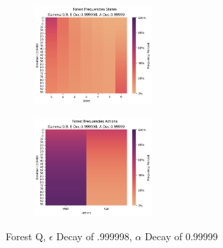 \documentclass[letterpaper]{article} %
\begin{document}
\begin{figure}[!htb]
	\begin{subfigure}[b]{0.25\textwidth}
		\centering
		\includegraphics[width=1.75in]{Figures/Forest_Frequencies_States_Gamma_0_9__E_Dec_0_999998__A_Dec_0_99999.png}
  	\end{subfigure}%
	\begin{subfigure}[b]{0.25\textwidth}
		\centering
		\includegraphics[width=1.75in]{Figures/Forest_Frequencies_Actions_Gamma_0_9__E_Dec_0_999998__A_Dec_0_99999.png}
  	\end{subfigure}%
\caption{Forest Q,  $\epsilon$ Decay of .999998, $\alpha$ Decay of 0.99999}
\label{fig:forest_q_e_999998_a_99999_frequencies}
\end{figure}
\end{document}
